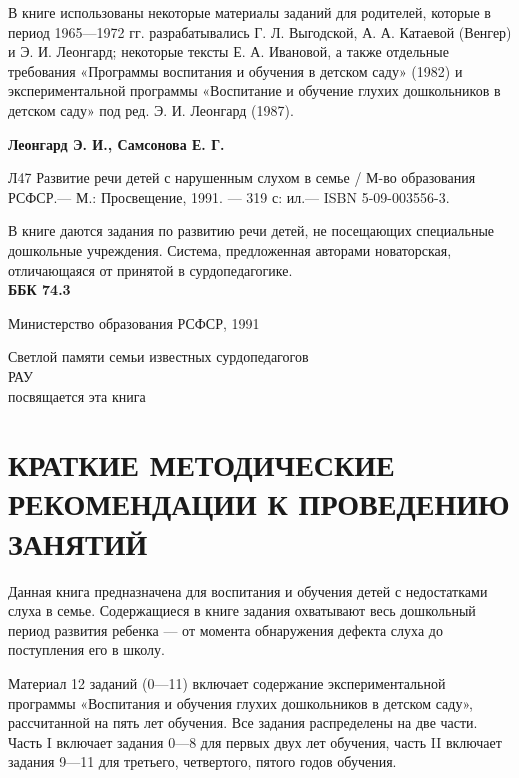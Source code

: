 \documentclass[a5paper]{book}
\begin{document}
\thispagestyle{plain}
\hspace{\parindent}

\pagebreak
\thispagestyle{plain}
В книге использованы некоторые материалы заданий для родителей, которые
в период 1965---1972 гг. разрабатывались Г. Л. Выгодской, А. А. Катаевой
(Венгер) и Э. И. Леонгард; некоторые тексты Е. А. Ивановой, а также
отдельные требования «Программы воспитания и обучения в детском саду»
(1982) и экспериментальной программы «Воспитание и обучение глухих
дошкольников в детском саду» под ред. Э. И. Леонгард (1987).

\vspace{2\parindent}

\textbf{Леонгард Э. И., Самсонова Е. Г.}

Л47\hspace{\parindent} Развитие речи детей с нарушенным слухом в семье /
М-во образования РСФСР.--- М.: Просвещение, 1991. ---
319 с: ил.--- ISBN 5-09-003556-3.

В книге даются задания по развитию речи детей, не посещающих специальные
дошкольные учреждения. Система, предложенная авторами новаторская,
отличающаяся от принятой в сурдопедагогике. \\

\textbf{ББК 74.3}

\textcopyright Министерство образования РСФСР, 1991
\vfill

\pagebreak
\pagestyle{mainstyle}

\hfill \begin{minipage}[c]{0.3\textwidth} \small {\raggedleft
Светлой памяти семьи известных 
сурдопедагогов} \\
РАУ  \\ 
{\raggedleft посвящается эта книга}
\end{minipage}

\section{КРАТКИЕ МЕТОДИЧЕСКИЕ РЕКОМЕНДАЦИИ К ПРОВЕДЕНИЮ ЗАНЯТИЙ}

Данная книга предназначена для воспитания и обучения детей с
недостатками слуха в семье. Содержащиеся в книге задания охватывают весь
дошкольный период развития ребенка --- от момента обнаружения дефекта
слуха до поступления его в школу.

Материал 12 заданий (0---11) включает содержание экспериментальной
программы «Воспитания и обучения глухих дошкольников в детском саду»,
рассчитанной на пять лет обучения. Все задания распределены на две
части. Часть I включает задания 0---8 для первых двух лет обучения,
часть II включает задания 9---11 для третьего, четвертого, пятого годов
обучения.
\end{document}
